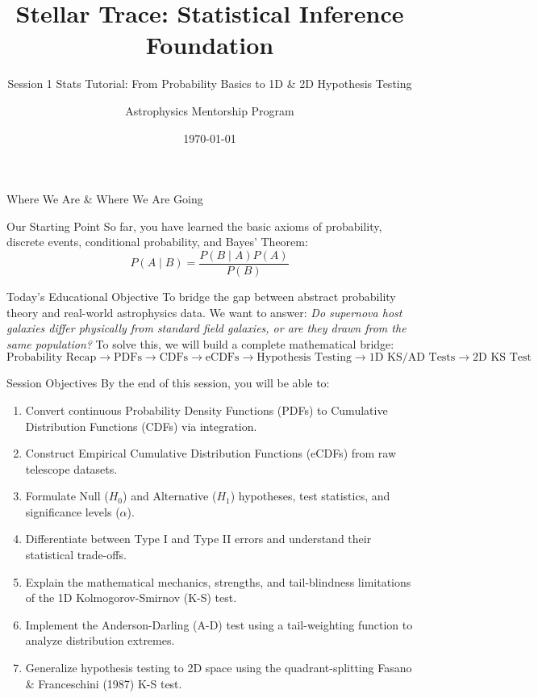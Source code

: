\documentclass[9pt]{beamer}
\title{Stellar Trace: Statistical Inference Foundation}
\subtitle{Session 1 Stats Tutorial: From Probability Basics to 1D \& 2D Hypothesis Testing}
\author{Astrophysics Mentorship Program}
\date{\today}
\begin{document}
\maketitle

\begin{frame}{Where We Are \& Where We Are Going}
  \begin{block}{Our Starting Point}
    So far, you have learned the basic axioms of probability, discrete events, conditional probability, and Bayes' Theorem:
    $$P(A \mid B) = \frac{P(B \mid A)P(A)}{P(B)}$$
  \end{block}
  \begin{block}{Today's Educational Objective}
    To bridge the gap between abstract probability theory and real-world astrophysics data. We want to answer:
    \textit{Do supernova host galaxies differ physically from standard field galaxies, or are they drawn from the same population?}
    To solve this, we will build a complete mathematical bridge:
    $$\text{Probability Recap} \rightarrow \text{PDFs} \rightarrow \text{CDFs} \rightarrow \text{eCDFs} \rightarrow \text{Hypothesis Testing} \rightarrow \text{1D KS/AD Tests} \rightarrow \text{2D KS Test}$$
  \end{block}
\end{frame}

\begin{frame}{Session Objectives}
  By the end of this session, you will be able to:
  \begin{enumerate}
    \item Convert continuous Probability Density Functions (PDFs) to Cumulative Distribution Functions (CDFs) via integration.
    \item Construct Empirical Cumulative Distribution Functions (eCDFs) from raw telescope datasets.
    \item Formulate Null ($H_0$) and Alternative ($H_1$) hypotheses, test statistics, and significance levels ($\alpha$).
    \item Differentiate between Type I and Type II errors and understand their statistical trade-offs.
    \item Explain the mathematical mechanics, strengths, and tail-blindness limitations of the 1D Kolmogorov-Smirnov (K-S) test.
    \item Implement the Anderson-Darling (A-D) test using a tail-weighting function to analyze distribution extremes.
    \item Generalize hypothesis testing to 2D space using the quadrant-splitting Fasano \& Franceschini (1987) K-S test.
  \end{enumerate}
\end{frame}
\end{document}
